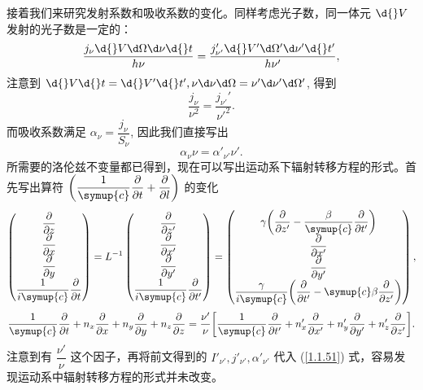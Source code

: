 \documentclass[../天体物理基础.tex]{subfiles}
\begin{document}
接着我们来研究发射系数和吸收系数的变化。同样考虑光子数，同一体元 $\d{}V$ 发射的光子数是一定的：
\begin{equation}
\frac{j_{\nu}\d{}V\d\Omega\d\nu\d{}t}{h\nu}=\frac{j_{\nu'}'\d{}V'\d\Omega'\d\nu'\d{}t'}{h\nu'},
\end{equation}
注意到 $\d{}V\d{}t=\d{}V'\d{}t',\nu\d\nu\d\Omega=\nu'\d\nu'\d\Omega'$, 得到
\begin{equation}
\frac{j_{\nu}}{\nu^{2}}=\frac{j_{\nu'}'}{\nu'^{2}}.
\end{equation}
而吸收系数满足 $\alpha_{\nu}=\dfrac{j_{\nu}}{S_{\nu}}$, 因此我们直接写出
\begin{equation}
\alpha_{\nu}\nu=\alpha'_{\nu'}\nu'.
\end{equation}
所需要的洛伦兹不变量都已得到，现在可以写出运动系下辐射转移方程的形式。首先写出算符 $\mleft(\dfrac{1}{\symup{c}}\dfrac{\partial{}}{\partial{}t}+\dfrac{\partial{}}{\partial{}l}\mright)$ 的变化
\begin{equation}
\begin{pmatrix}
\dfrac{\partial}{\partial z}\\
\dfrac{\partial}{\partial x}\\
\dfrac{\partial}{\partial y}\\
\dfrac{1}{i\symup{c}}\dfrac{\partial}{\partial t}\\
\end{pmatrix}
=L^{-1}
\begin{pmatrix}
\dfrac{\partial}{\partial z'}\\
\dfrac{\partial}{\partial x'}\\
\dfrac{\partial}{\partial y'}\\
\dfrac{1}{i\symup{c}}\dfrac{\partial}{\partial t'}\\
\end{pmatrix}
=\begin{pmatrix}
\gamma\mleft(\dfrac{\partial}{\partial z'}-\dfrac{\beta}{\symup{c}}\dfrac{\partial}{\partial t'}\mright)\\
\dfrac{\partial}{\partial x'}\\
\dfrac{\partial}{\partial y'}\\
\dfrac{\gamma}{i\symup{c}}\mleft(\dfrac{\partial}{\partial t'}-\symup{c}\beta\dfrac{\partial}{\partial z'}\mright)\\
\end{pmatrix},
\end{equation}
\begin{equation}
\frac{1}{\symup{c}}\frac{\partial }{\partial t}+n_{x}\frac{\partial}{\partial x}+n_{y}\frac{\partial}{\partial y}+n_{z}\frac{\partial}{\partial z}=\frac{\nu'}{\nu}\mleft[\frac{1}{\symup{c}}\frac{\partial}{\partial t'}+n_{x}'\frac{\partial}{\partial x'}+n_{y}'\frac{\partial}{\partial y'}+n_{z}'\frac{\partial}{\partial z'}\mright].
\end{equation}
注意到有 $\dfrac{\nu'}{\nu}$ 这个因子，再将前文得到的 $I'_{\nu'}, j'_{\nu'},\alpha'_{\nu'}$ 代入 (\ref{1.1.51}) 式，容易发现运动系中辐射转移方程的形式并未改变。
\end{document}
